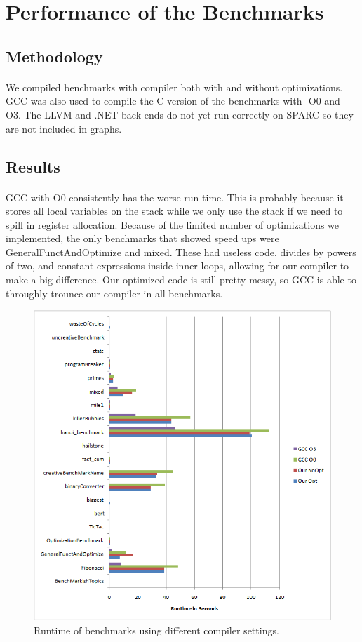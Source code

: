 \documentclass[12pt]{article}
\begin{document}
\section{Performance of the Benchmarks}
\subsection{Methodology}
\paragraph{}
We compiled benchmarks with compiler both with and without optimizations.  GCC was also used to compile the C version of the benchmarks with -O0 and -O3.
The LLVM and .NET back-ends do not yet run correctly on SPARC so they are not included in graphs.

\subsection{Results}
\paragraph{}
GCC with O0 consistently has the worse run time.
This is probably because it stores all local variables on the stack while we only use the stack if we need to spill in register allocation.
Because of the limited number of optimizations we implemented, the only benchmarks that showed speed ups were GeneralFunctAndOptimize and mixed.
These had useless code, divides by powers of two, and constant expressions inside inner loops, allowing for our compiler to make a big difference.
Our optimized code is still pretty messy, so GCC is able to throughly trounce our compiler in all benchmarks.


\begin{figure}
\includegraphics{Chart.png}
\caption{Runtime of benchmarks using different compiler settings.}
\label{chart}
\end{figure}
\end{document}
